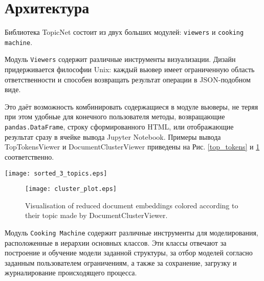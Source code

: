 \section{Архитектура} 

Библиотека TopicNet состоит из двух больших модулей: \texttt{viewers} и \texttt{cooking machine}.  

Модуль \texttt{Viewers} содержит различные инструменты визуализации. Дизайн придерживается философии Unix: каждый вьювер имеет ограниченную область ответственности и способен возвращать результат операции в JSON-подобном виде.

Это даёт возможность комбинировать содержащиеся в модуле вьюверы, не теряя при этом удобные для конечного пользователя методы, возвращающие \texttt{pandas.DataFrame}, строку сформированного HTML, или отображающие результат сразу в ячейке вывода Jupyter Notebook. Примеры вывода TopTokensViewer и DocumentClusterViewer приведены на Рис. \ref{top_tokens} и \ref{documents_clusters} соответственно.  

\begin{figure*}[h]
    \centering
    \texttt{[image: sorted\_3\_topics.eps]}
    \caption{Output of the TopTokensViewer. Token score in the topic is calculated for every token, score function can be specified at the stage of a viewer initialization.}
\label{top_tokens}
\end{figure*} 

\begin{figure}[h]
    \centering
    \texttt{[image: cluster\_plot.eps]}
    \caption{Visualisation of reduced document embeddings colored according to their topic made by DocumentClusterViewer.}
\label{documents_clusters}

\end{figure} 



Модуль \texttt{Cooking Machine} содержит различные инструменты для моделирования, расположенные в иерархии основных классов. Эти классы отвечают за построение и обучение модели заданной структуры, за отбор моделей согласно заданным пользователем ограничениям, а также за сохранение, загрузку и журналирование происходящего процесса.

